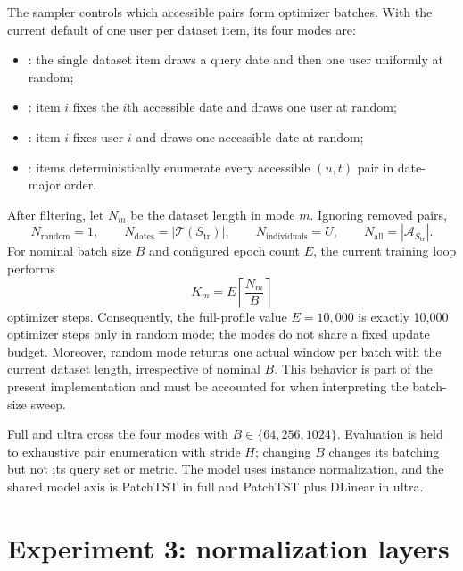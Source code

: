 \documentclass[10pt]{article}
\newcommand{\code}[1]{\texttt{\detokenize{#1}}}
\begin{document}
The sampler controls which accessible pairs form optimizer batches. With the
current default of one user per dataset item, its four modes are:
\begin{itemize}
  \item \code{random}: the single dataset item draws a query date and then one
    user uniformly at random;
  \item \code{dates}: item $i$ fixes the $i$th accessible date and draws one
    user at random;
  \item \code{individuals}: item $i$ fixes user $i$ and draws one accessible
    date at random;
  \item \code{all}: items deterministically enumerate every accessible
    $(u,t)$ pair in date-major order.
\end{itemize}
After filtering, let $N_m$ be the dataset length in mode $m$. Ignoring removed
pairs,
\[
  N_{\mathrm{random}}=1,\qquad
  N_{\mathrm{dates}}=|\mathcal T(S_{\mathrm{tr}})|,\qquad
  N_{\mathrm{individuals}}=U,\qquad
  N_{\mathrm{all}}=|\mathcal A_{S_{\mathrm{tr}}}|.
\]
For nominal batch size $B$ and configured epoch count $E$, the current training
loop performs
\[
  K_m=E\left\lceil\frac{N_m}{B}\right\rceil
\]
optimizer steps. Consequently, the full-profile value $E=10{,}000$ is exactly
10,000 optimizer steps only in random mode; the modes do not share a fixed
update budget. Moreover, random mode returns one actual window per batch with
the current dataset length, irrespective of nominal $B$. This behavior is part
of the present implementation and must be accounted for when interpreting the
batch-size sweep.

Full and ultra cross the four modes with $B\in\{64,256,1024\}$. Evaluation is
held to exhaustive pair enumeration with stride $H$; changing $B$ changes its
batching but not its query set or metric. The model uses instance normalization,
and the shared model axis is PatchTST in full and PatchTST plus DLinear in ultra.

\section{Experiment 3: normalization layers}
\label{sec:normalization}
\end{document}
